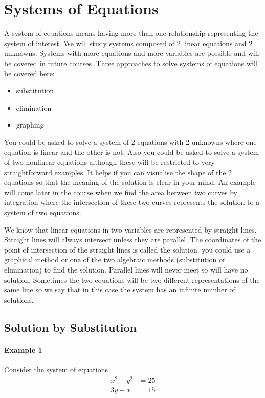 \chapter{Systems of Equations}

A system of equations means having more than one relationship representing the system of interest. We will study systems composed of 2 linear equations and 2 unknowns. Systems with more equations and more variables are possible and will be covered in future courses. Three approaches to solve systems of equations will be covered here:
\begin{itemize}
	\item substitution
	\item elimination
	\item graphing
\end{itemize}

You could be asked to solve a system of 2 equations with 2 unknowns where one equation is linear and the other is not. Also you could be asked to solve a system of two nonlinear
equations although these will be restricted to very straightforward examples. It helps if you can visualise
the shape of the 2 equations so that the meaning of the solution is clear in your mind. An example will come later in the course when we find the area between two curves by integration where the intersection of these two curves represents the solution to a system of two equations.

We know that linear equations in two variables are represented by straight lines. Straight
lines will always intersect unless they are parallel. The coordinates of the point of intersection of the straight
lines is called the solution. you could use a graphical method or one of the two algebraic methods (substitution
or elimination) to find the solution. Parallel lines will never meet so will have no solution. Sometimes
the two equations will be two different representations of the same line so we say that in this case the system has an infinite number of solutions. 

\section{Solution by Substitution}
\subsubsection{Example 1}
Consider the system of equations
\begin{align}x^{2} +y^{2} &  = 25 \tag{1} \\
3 y +x &  = 15 \tag{2}\end{align}

